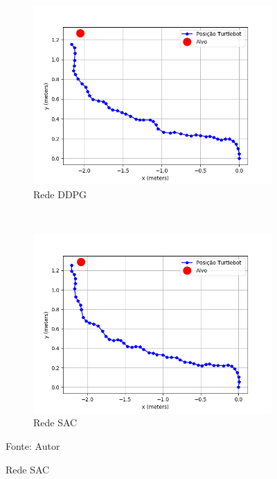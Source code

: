\vspace{0.25cm} 
\begin{figure}[H]
\caption{Trajetória do Turtlebot3 no primeiro ambiente real}
    \begin{center}
    \begin{subfigure}[b]{0.48\textwidth}
        \includegraphics[width=\textwidth]{imagens/real_envs/real_env1_ddpg/graph.png}
        \caption{Rede DDPG}
        \label{subfig:ddpg_real_env1}
    \end{subfigure}
    ~
    \begin{subfigure}[b]{0.48\textwidth}
        \includegraphics[width=\textwidth]{imagens/real_envs/real_env1_sac/graph.png}
        \caption{Rede SAC}
        \label{subfig:sac_real_env1}
    \end{subfigure}
    \end{center}
    \label{fig:real_env1}
\small{Fonte: Autor}
\end{figure}

